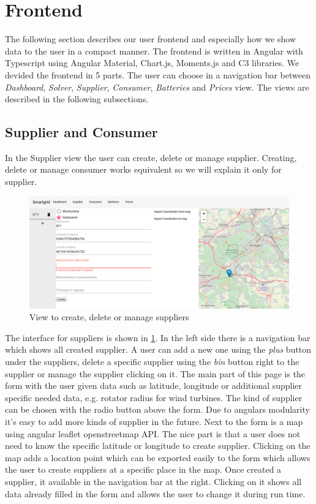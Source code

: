 \section{Frontend}\label{sec:frontend}
The following section describes our user frontend and especially how we show data to the user in a compact manner.
The frontend is written in Angular with Typescript using Angular Material, Chart.js, Moments.js and C3 libraries.
We devided the frontend in 5 parts.
The user can choose in a navigation bar between \textit{Dashboard},
\textit{Solver}, \textit{Supplier}, \textit{Consumer}, \textit{Batteries} and \textit{Prices} view.
The views are described in the following subsections.

\subsection{Supplier and Consumer}
In the Supplier view the user can create, delete or manage supplier.
Creating, delete or manage consumer works equivalent so we will explain it only for supplier.

\begin{figure}[!h]
    \centering
    \includegraphics[width=1.00\textwidth]{../figures/supplierView.PNG}
    \caption{View to create, delete or manage suppliers}
    \label{fig:suppliers}
\end{figure}

The interface for suppliers is shown in \cref{fig:suppliers}.
In the left side there is a navigation bar which shows all created supplier.
A user can add a new one using the \textit{plus} button under the suppliers, delete a specific supplier using the \textit{bin} button right to the supplier or manage the supplier clicking on it.
The main part of this page is the form with the user given data such as latitude, longitude or additional supplier specific needed data, e.g. rotator radius for wind turbines.
The kind of supplier can be chosen with the radio button above the form.
Due to angulars modularity it's easy to add more kinds of supplier in the future.
Next to the form is a map using angular leaflet openstreetmap API.
The nice part is that a user does not need to know the specific latitude or longitude to create supplier.
Clicking on the map adds a location point which can be exported easily to the form which allows the user to create suppliers at a specific place in the map.
Once created a supplier, it available in the navigation bar at the right.
Clicking on it shows all data already filled in the form and allows the user to change it during run time.


